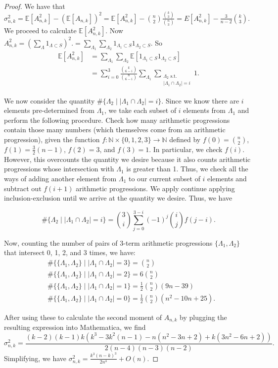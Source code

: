 \documentclass[12pt]{article} %
\newcommand{\abs}[1]{\left\lvert#1\right\rvert}
\newcommand{\E}{\mathbb{E}}
\newcommand{\bbn}{\mathbb{N}}
\theoremstyle{definition}
\theoremstyle{definition}
\begin{document}
\begin{proof}
We have that $\sigma_{n,k}^2 = \E[A_{n,k}^2] - (\E[A_{n,k}])^2 = \E[A_{n,k}^2] - {n\choose 2}\frac{{k\choose 3}}{{n\choose 3}} = E[A_{n,k}^2] - \frac{3}{n-2} {k\choose 3}.$ We proceed to calculate $\E[A_{n,k}^2]$. Now $A_{n,k}^2 = (\sum_{\Lambda} 1_{\Lambda \subset S})^2. = \sum_{\Lambda_1}\sum_{\Lambda_2} 1_{\Lambda_1 \subset S} 1_{\Lambda_2 \subset S}.$ So 
\begin{align*}
\E[A_{n,k}^2] &= \sum_{\Lambda_1}\sum_{\Lambda_2} \E[1_{\Lambda_1 \subset S} 1_{\Lambda_2 \subset S}] \\
&= \sum_{i = 0}^3 \frac{{k\choose{6-i}}}{{n\choose{6-i}}} \sum_{\Lambda_1}\sum_{\substack{\Lambda_2 \textrm{ s.t. } \\ \abs{\Lambda_1 \cap \Lambda_2} = i}} 1.
\end{align*}

We now consider the quantity $\#\{\Lambda_2 \mid \abs{\Lambda_1 \cap \Lambda_2} = i\}$. Since we know there are $i$ elements pre-determined from $\Lambda_1$, we take each subset of $i$ elements from $\Lambda_1$ and perform the following procedure. Check how many arithmetic progressions contain those many numbers (which themselves come from an arithmetic progression), given the function $f: \bbn \times \{0, 1, 2, 3\} \to \bbn$ defined by $f(0) = \binom{n}{2}$, $f(1) = \frac{3}{2}(n-1)$, $f(2) = 3$, and $f(3) = 1$. In particular, we check $f(i)$. However, this overcounts the quantity we desire because it also counts arithmetic progressions whose intersection with $\Lambda_1$ is greater than 1. Thus, we check all the ways of adding another element from $\Lambda_1$ to our current subset of $i$ elements and subtract out $f(i+1)$ arithmetic progressions. We apply continue applying inclusion-exclusion until we arrive at the quantity we desire. Thus, we have

$$ \#\{\Lambda_2 \mid \abs{\Lambda_1 \cap \Lambda_2} = i\} = \binom{3}{i}\sum_{j=0}^{3-i} {(-1)^{j}\binom{i}{j}f(j-i)}. $$

Now, counting the number of pairs of 3-term arithmetic progressions $\{\Lambda_1, \Lambda_2\}$ that intersect 0, 1, 2, and 3 times, we have:
\begin{align*}
&\#\{\{\Lambda_1, \Lambda_2\} \mid \abs{\Lambda_1 \cap \Lambda_2} = 3\} = {n\choose 2} \\ 
&\#\{\{\Lambda_1, \Lambda_2\} \mid \abs{\Lambda_1 \cap \Lambda_2} = 2\} = 6{n\choose 2} \\
&\#\{\{\Lambda_1, \Lambda_2\} \mid \abs{\Lambda_1 \cap \Lambda_2} = 1\} = \frac{1}{2}{n\choose2}(9n-39) \\
&\#\{\{\Lambda_1, \Lambda_2\} \mid \abs{\Lambda_1 \cap \Lambda_2} = 0\} 
= \frac{1}{2}{n\choose 2}(n^2-10n+25).
\end{align*} 

After using these to calculate the second moment of $A_{n,k}$ by plugging the resulting expression into Mathematica, we find
\[ \sigma_{n,k}^2 = \frac{(k-2)(k-1)k(k^3-3k^2(n-1) - n(n^2-3n+2)+k(3n^2-6n+2))}{2(n-4)(n-3)(n-2)}. \]
Simplifying, we have $\sigma_{n,k}^2 = \frac{k^3(n-k)^3}{2n^4} + O(n)$.
\end{proof}
\end{document}
